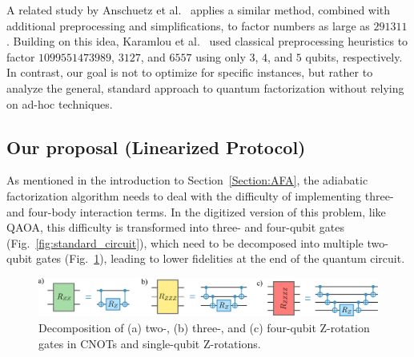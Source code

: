 A related study by Anschuetz et al.~\cite{anschuetz_variational_2018} applies a similar method, combined with additional preprocessing and simplifications, to factor numbers as large as $291311$. Building on this idea, Karamlou et al.~\cite{karamlou_analyzing_2021} used classical preprocessing heuristics to factor $1099551473989$, $3127$, and $6557$ using only $3$, $4$, and $5$ qubits, respectively. In contrast, our goal is not to optimize for specific instances, but rather to analyze the general, standard approach to quantum factorization without relying on ad-hoc techniques.

\subsection{Our proposal (Linearized Protocol)}
As mentioned in the introduction to Section~\ref{Section:AFA}, the adiabatic factorization algorithm
needs to deal with the difficulty of implementing three- and four-body interaction terms. In the 
digitized version of this problem, like QAOA, this difficulty is transformed into three- and
four-qubit gates (Fig.~\ref{fig:standard_circuit}),
which need to be decomposed into multiple two-qubit gates (Fig.~\ref{fig:gate_decomposition}),
leading to lower fidelities at the end of the quantum circuit.

\begin{figure}[h]
    \centering
    \includegraphics[width=1\textwidth]{02-factorization/figs/gate_decomposition.pdf}
    \caption{Decomposition of (a) two-, (b) three-, and (c) four-qubit Z-rotation gates in CNOTs and
    single-qubit Z-rotations.}
    \label{fig:gate_decomposition}
\end{figure}

